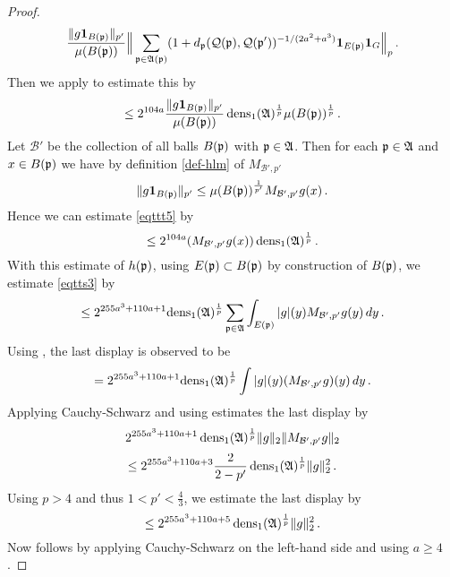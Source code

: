\begin{proof}
\begin{equation}
    \frac{\|g\mathbf{1}_{B({\mathfrak p})}\|_{p'}}{\mu(B({\mathfrak p}))}
    \Big\|\sum_{{\mathfrak p}\in\mathfrak{A}({\mathfrak p})}(1+d_{{\mathfrak p}}({\mathcal{Q}}({\mathfrak p}), {\mathcal{Q}}({\mathfrak p}'))^{-1/(2a^2+a^3)}\mathbf{1}_{E({\mathfrak p})}\mathbf{1}_G\Big\|_{p}\, .
\end{equation}
Then we apply  to estimate this by
\begin{equation}\label{eqttt5}
    \le 2^{104a}
    \frac{\|g\mathbf{1}_{B({\mathfrak p})}\|_{p'}}{\mu(B({\mathfrak p}))}
    \operatorname{\operatorname{dens}}_1(\mathfrak{A})^{\frac 1p}\mu(B({\mathfrak p}))^{\frac 1p}\,.
\end{equation}
Let $\mathcal{B}'$ be the collection of all balls
$B({\mathfrak p})$ with ${\mathfrak p}\in \mathfrak{A}$. Then
for each ${\mathfrak p}\in \mathfrak{A}$ and $x\in B({\mathfrak p})$ we have by
definition \eqref{def-hlm} of $M_{\mathcal{B}',p'}$
\begin{equation}
    \|g\mathbf{1}_{B({\mathfrak p})}\|_{p'}\le
    \mu(B({\mathfrak p}))^{\frac 1{p'}} M_{\mathcal{B}',p'}g(x) \, .
\end{equation}
Hence we can estimate \eqref{eqttt5} by
\begin{equation}
\label{eqttt5b}
    \le
    2^{104a}
    (M_{\mathcal{B}', p'}g(x))
   \operatorname{\operatorname{dens}}_1(\mathfrak{A})^{\frac 1p}\, .
\end{equation}
With this estimate of $h({\mathfrak p})$,
using $E({\mathfrak p})\subset B({\mathfrak p})$ by construction of $B({\mathfrak p})$, we estimate
\eqref{eqtts3} by
 \begin{equation}\label{eqtts4}
 \le 2^{255a^3+110a + 1} { \operatorname{\operatorname{dens}}_1(\mathfrak{A})^{\frac 1p}}\sum_{{\mathfrak p}\in \mathfrak{A}}
 \int_{E({\mathfrak p})}|g|(y)M_{\mathcal{B}', p'}g(y) \, dy\,.
         \end{equation}
Using ,
the last display is observed to be
\begin{equation}\label{eqtts4a}
= 2^{255a^3+110a + 1}
 {\operatorname{\operatorname{dens}}_1(\mathfrak{A})^{\frac 1p}} \int |g|(y)(M_{\mathcal{B}', p'}g)(y) \, dy\,.
         \end{equation}
Applying Cauchy-Schwarz and using  estimates the last display by
\begin{equation}
    2^{255a^3+110a + 1} \operatorname{\operatorname{dens}}_1(\mathfrak{A})^{\frac 1p}
    \|g\|_2 \|M_{\mathcal{B}', p'} g\|_2
\end{equation}
\begin{equation}
    \le 2^{255a^3+110a + 3}\frac{2}{2-p'}
    \operatorname{\operatorname{dens}}_1(\mathfrak{A})^{\frac 1p}\|g\|_2 ^2\,.
\end{equation}
Using $p>4$ and thus $1<p'<\frac 43$, we estimate the last display by
\begin{equation}
    \le 2^{255a^3+110a + 5} \operatorname{\operatorname{dens}}_1(\mathfrak{A})^{\frac 1p}
    \|g\|_2^2\,.
\end{equation}
Now  follows by applying Cauchy-Schwarz on the left-hand side and using
$a\ge 4$.
\end{proof}
